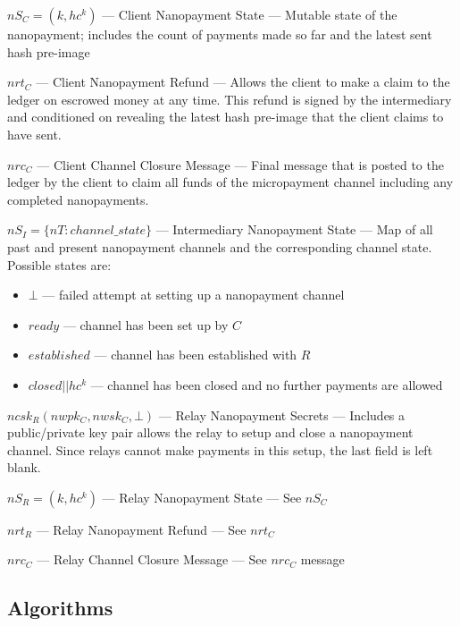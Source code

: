 $nS_C = (k, hc^k)$ --- Client Nanopayment State --- Mutable state of the
nanopayment; includes the count of payments made so far and the latest sent hash
pre-image

$nrt_C$ --- Client Nanopayment Refund --- Allows the client to make a claim
to the ledger on escrowed money at any time. This refund is signed by the
intermediary and conditioned on revealing the latest hash pre-image that the
client claims to have sent.

$nrc_C$ --- Client Channel Closure Message --- Final message that is
posted to the ledger by the client to claim all funds of the
micropayment channel including any completed nanopayments.

$nS_I = \{nT: channel\_state\}$ --- Intermediary Nanopayment State --- Map of
all past and present nanopayment channels and the corresponding channel
state. Possible states are:

\begin{itemize}
\item $\bot$ --- failed attempt at setting up a nanopayment channel
\item $ready$ --- channel has been set up by $C$
\item $established$ --- channel has been established with $R$
\item $closed||hc^k$ --- channel has been closed and no further payments
  are allowed
\end{itemize}

$ncsk_R (nwpk_C, nwsk_C, \bot)$ --- Relay Nanopayment Secrets --- Includes a
public/private key pair allows the relay to setup and close a nanopayment
channel. Since relays cannot make payments in this setup, the last field is left
blank.

$nS_R = (k, hc^k)$ --- Relay Nanopayment State --- See $nS_C$

$nrt_R$ --- Relay Nanopayment Refund --- See $nrt_C$

$nrc_C$ --- Relay Channel Closure Message --- See $nrc_C$
message

\subsection{Algorithms}


